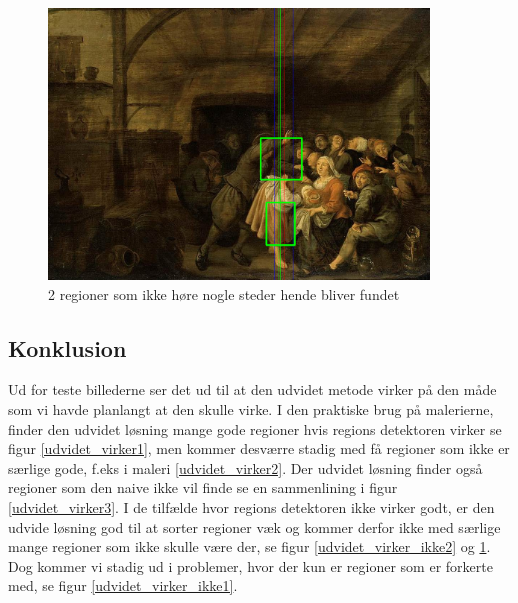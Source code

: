 \begin{figure}[h!!]
	\begin{center}
		\includegraphics[width=0.9\textwidth,angle=0]{afsnit/afprovning/billeder/udvidet_losning/udvidet_sfarver_mdetaljer.png}
	\end{center}
	\caption[]{2 regioner som ikke høre nogle steder hende bliver fundet}
	\label{udvidet_virker_ikke3}
\end{figure}
\clearpage

\subsection{Konklusion}
Ud for teste billederne ser det ud til at den udvidet metode virker på
den måde som vi havde planlangt at den skulle virke. I den praktiske
brug på malerierne, finder den udvidet løsning mange gode regioner hvis
regions detektoren virker se figur \ref{udvidet_virker1}, men kommer
desværre stadig med få regioner som ikke er særlige gode, f.eks i maleri
\ref{udvidet_virker2}. Der udvidet løsning finder også regioner som den
naive ikke vil finde se en sammenlining i figur \ref{udvidet_virker3}. I
de tilfælde hvor regions detektoren ikke virker godt, er den udvide
løsning god til at sorter regioner væk og kommer derfor ikke med særlige
mange regioner som ikke skulle være der, se figur
\ref{udvidet_virker_ikke2} og \ref{udvidet_virker_ikke3}. Dog kommer vi
stadig ud i problemer, hvor der kun er regioner som er forkerte med,
se figur \ref{udvidet_virker_ikke1}.
